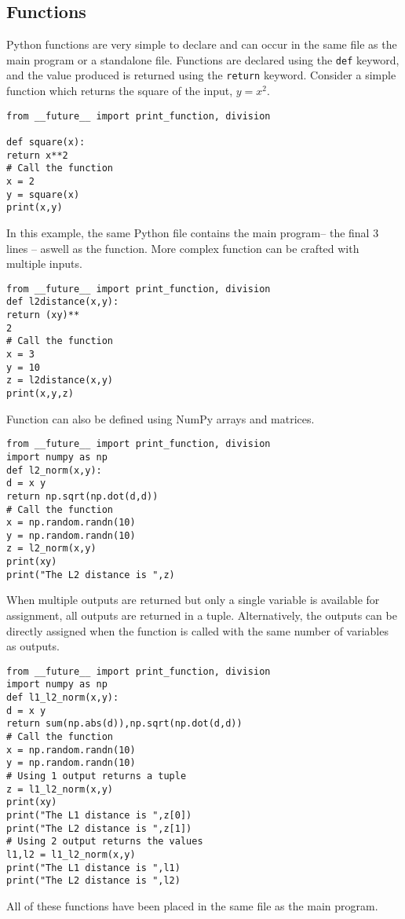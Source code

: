 \documentclass[KSmain.tex]{subfiles}
\begin{document}
\subsection{Functions}
Python functions are very simple to declare and can occur in the same file as the main program or a standalone
file. Functions are declared using the \texttt{def} keyword, and the value produced is returned using the
\texttt{return} keyword. Consider a simple function which returns the square of the input, $y = x^2$.
\begin{verbatim}
from __future__ import print_function, division

def square(x):
return x**2
# Call the function
x = 2
y = square(x)
print(x,y)
\end{verbatim}
In this example, the same Python file contains the main program– the final 3 lines – aswell as the function.
More complex function can be crafted with multiple inputs.
\begin{verbatim}
from __future__ import print_function, division
def l2distance(x,y):
return (xy)**
2
# Call the function
x = 3
y = 10
z = l2distance(x,y)
print(x,y,z)
\end{verbatim}
Function can also be defined using NumPy arrays and matrices.
\begin{verbatim}
from __future__ import print_function, division
import numpy as np
def l2_norm(x,y):
d = x y
return np.sqrt(np.dot(d,d))
# Call the function
x = np.random.randn(10)
y = np.random.randn(10)
z = l2_norm(x,y)
print(xy)
print("The L2 distance is ",z)
\end{verbatim}
When multiple outputs are returned but only a single variable is available for assignment, all outputs are
returned in a tuple. Alternatively, the outputs can be directly assigned when the function is called with
the same number of variables as outputs.
\begin{verbatim}
from __future__ import print_function, division
import numpy as np
def l1_l2_norm(x,y):
d = x y
return sum(np.abs(d)),np.sqrt(np.dot(d,d))
# Call the function
x = np.random.randn(10)
y = np.random.randn(10)
# Using 1 output returns a tuple
z = l1_l2_norm(x,y)
print(xy)
print("The L1 distance is ",z[0])
print("The L2 distance is ",z[1])
# Using 2 output returns the values
l1,l2 = l1_l2_norm(x,y)
print("The L1 distance is ",l1)
print("The L2 distance is ",l2)
\end{verbatim}
All of these functions have been placed in the same file as the main program. 
\end{document}
